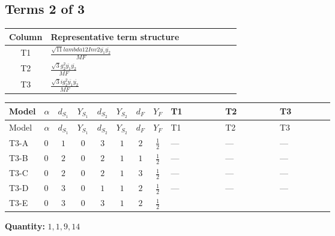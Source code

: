 \documentclass[8pt]{article}
\begin{document}
\begin{landscape}
\subsection*{Terms 2 of 3}
\begin{center}
\begin{tabular}{@{}c >{\raggedright\arraybackslash}p{0.82\linewidth}@{}}
\toprule
Column & Representative term structure \\
\midrule
T1 & \(\displaystyle \frac{\sqrt{11} lambda12Inv2 \overline{y_{1}} \overline{y_{2}}}{MF}\) \\
\midrule
T2 & \(\displaystyle \frac{\sqrt{3} g_{2}^{2} \overline{y_{1}} \overline{y_{2}}}{MF}\) \\
\midrule
T3 & \(\displaystyle \frac{\sqrt{3} i g_{2}^{2} \overline{y_{1}} \overline{y_{2}}}{MF}\) \\
\midrule
\bottomrule
\end{tabular}
\end{center}
\smallskip
\tiny
\begin{longtable}{@{}llcccccc >{\raggedright\arraybackslash}p{0.21\linewidth} >{\raggedright\arraybackslash}p{0.21\linewidth} >{\raggedright\arraybackslash}p{0.21\linewidth}@{}}
\toprule
Model & $\alpha$ & $d_{S_1}$ & $Y_{S_1}$ & $d_{S_2}$ & $Y_{S_2}$ & $d_F$ & $Y_F$ & T1 & T2 & T3 \\
\midrule
\endfirsthead
\toprule
Model & $\alpha$ & $d_{S_1}$ & $Y_{S_1}$ & $d_{S_2}$ & $Y_{S_2}$ & $d_F$ & $Y_F$ & T1 & T2 & T3 \\
\midrule
\endhead
T3-A & $0$ & $1$ & $0$ & $3$ & $1$ & $2$ & $\frac{1}{2}$ & --- & --- & --- \\
\midrule
T3-B & $0$ & $2$ & $0$ & $2$ & $1$ & $1$ & $\frac{1}{2}$ & --- & --- & --- \\
\midrule
T3-C & $0$ & $2$ & $0$ & $2$ & $1$ & $3$ & $\frac{1}{2}$ & --- & --- & --- \\
\midrule
T3-D & $0$ & $3$ & $0$ & $1$ & $1$ & $2$ & $\frac{1}{2}$ & --- & --- & --- \\
\midrule
T3-E & $0$ & $3$ & $0$ & $3$ & $1$ & $2$ & $\frac{1}{2}$ & \scriptsize\adjustbox{max width=\linewidth}{$\begin{gathered} \frac{3 \sqrt{11} lambda12Inv2 \overline{y_{1}} \overline{y_{2}}}{22 MF}\end{gathered}$} & \scriptsize\adjustbox{max width=\linewidth}{$\begin{gathered} \frac{49 \sqrt{3} g_{2}^{2} \overline{y_{1}} \overline{y_{2}}}{24 MF}\end{gathered}$} & \scriptsize\adjustbox{max width=\linewidth}{$\begin{gathered} - \frac{\sqrt{3} i g_{2}^{2} \overline{y_{1}} \overline{y_{2}}}{6 MF}\end{gathered}$} \\
\midrule
\bottomrule
\end{longtable}
\clearpage
\noindent\textbf{Quantity: }$\mathrm{1,1,9,14}$\par\smallskip

\end{landscape}
\end{document}
